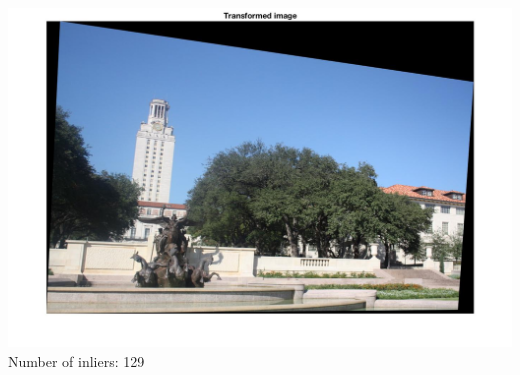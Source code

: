 \documentclass[a4paper,11pt]{article}
\begin{document}
\includegraphics[width=\textwidth]{hw3/code/4}\\

Number of inliers: 129\\
\end{document}
